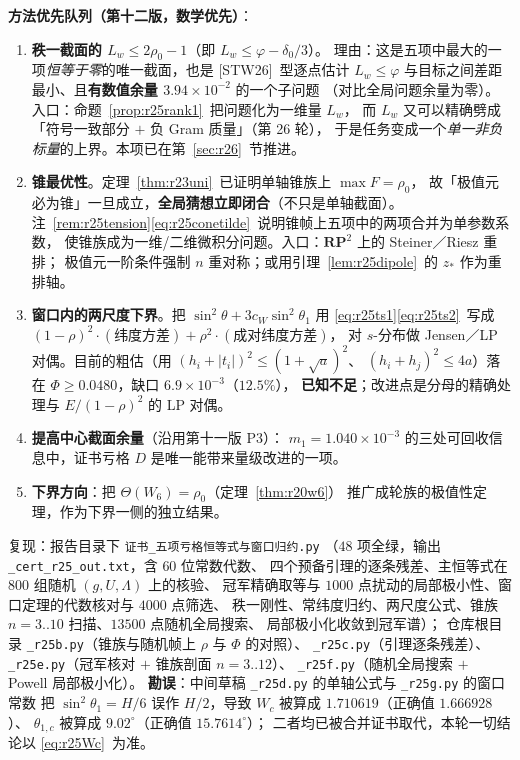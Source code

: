 \documentclass[UTF8,11pt]{ctexart}
\theoremstyle{definition}
\newcommand{\Lam}{\Lambda}
\newcommand{\STW}{\textup{[STW26]}}
\begin{document}
\textbf{方法优先队列（第十二版，数学优先）}：
\begin{enumerate}\itemsep2pt
\item[\textbf{P1}] \textbf{秩一截面的 $L_w\le2\rho_0-1$}（即 $L_w\le\varphi-\delta_0/3$）。
理由：这是五项中最大的一项\emph{恒等于零}的唯一截面，也是 \STW\ 型逐点估计
$L_w\le\varphi$ 与目标之间差距最小、且\textbf{有数值余量 $3.94\times10^{-2}$} 的一个子问题
（对比全局问题余量为零）。入口：命题~\ref{prop:r25rank1}~把问题化为一维量 $L_w$，
而 $L_w$ 又可以精确劈成「符号一致部分 $+$ 负 Gram 质量」（第 26 轮），
于是任务变成一个\emph{单一非负标量}的上界。本项已在第~\ref{sec:r26}~节推进。
\item[\textbf{P2}] \textbf{锥最优性}。定理~\ref{thm:r23uni}~已证明单轴锥族上 $\max F=\rho_0$，
故「极值元必为锥」一旦成立，\textbf{全局猜想立即闭合}（不只是单轴截面）。
注~\ref{rem:r25tension}\eqref{eq:r25conetilde}~说明锥帧上五项中的两项合并为单参数系数，
使锥族成为一维/二维微积分问题。入口：$\mathbf{RP}^2$ 上的 Steiner／Riesz 重排；
极值元一阶条件强制 $n$ 重对称；或用引理~\ref{lem:r25dipole}~的 $z_*$ 作为重排轴。
\item[\textbf{P3}] \textbf{窗口内的两尺度下界}。把
$\sin^2\theta+3c_W\sin^2\theta_1$ 用 \eqref{eq:r25ts1}\eqref{eq:r25ts2}~写成
$(1-\rho)^2\cdot(\text{纬度方差})+\rho^2\cdot(\text{成对纬度方差})$，
对 $s$-分布做 Jensen／LP 对偶。目前的粗估（用 $(h_i+|t_i|)^2\le(1+\sqrt a)^2$、
$(h_i+h_j)^2\le4a$）落在 $\Phi\ge0.0480$，缺口 $6.9\times10^{-3}$（$12.5\%$），
\textbf{已知不足}；改进点是分母的精确处理与 $E/(1-\rho)^2$ 的 LP 对偶。
\item[\textbf{P4}] \textbf{提高中心截面余量}（沿用第十一版 P3）：
$m_1=1.040\times10^{-3}$ 的三处可回收信息中，证书亏格 $D$ 是唯一能带来量级改进的一项。
\item[\textbf{副}] \textbf{下界方向}：把 $\Theta(W_6)=\rho_0$（定理~\ref{thm:r20w6}）
推广成轮族的极值性定理，作为下界一侧的独立结果。
\end{enumerate}

复现：报告目录下 \texttt{证书\_五项亏格恒等式与窗口归约.py}
（$48$ 项全绿，输出 \texttt{\_cert\_r25\_out.txt}，含 $60$ 位常数代数、
四个预备引理的逐条残差、主恒等式在 $800$ 组随机 $(g,U,\Lam)$ 上的核验、
冠军精确取等与 $1000$ 点扰动的局部极小性、窗口定理的代数核对与 $4000$ 点筛选、
秩一刚性、常纬度归约、两尺度公式、锥族 $n=3..10$ 扫描、$13500$ 点随机全局搜索、
局部极小化收敛到冠军谱）；
仓库根目录 \texttt{\_r25b.py}（锥族与随机帧上 $\rho$ 与 $\Phi$ 的对照）、
\texttt{\_r25c.py}（引理逐条残差）、\texttt{\_r25e.py}（冠军核对 $+$ 锥族剖面 $n=3..12$）、
\texttt{\_r25f.py}（随机全局搜索 $+$ Powell 局部极小化）。
\textbf{勘误}：中间草稿 \texttt{\_r25d.py} 的单轴公式与 \texttt{\_r25g.py} 的窗口常数
把 $\sin^2\theta_1=H/6$ 误作 $H/2$，导致 $W_c$ 被算成 $1.710619$（正确值 $1.666928$）、
$\theta_{1,c}$ 被算成 $9.02^\circ$（正确值 $15.7614^\circ$）；
二者均已被合并证书取代，本轮一切结论以 \eqref{eq:r25Wc}~为准。
\end{document}
